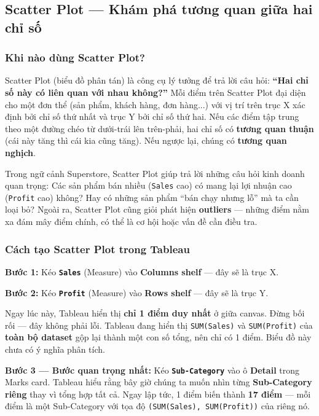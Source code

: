\documentclass[12pt]{article}
\begin{document}
\subsection{Scatter Plot --- Khám phá tương quan giữa hai chỉ số}

\subsubsection{Khi nào dùng Scatter Plot?}

\noindent Scatter Plot (biểu đồ phân tán) là công cụ lý tưởng để trả lời câu hỏi: \textbf{``Hai chỉ số này có liên quan với nhau không?''} Mỗi điểm trên Scatter Plot đại diện cho một đơn thể (sản phẩm, khách hàng, đơn hàng...) với vị trí trên trục X xác định bởi chỉ số thứ nhất và trục Y bởi chỉ số thứ hai. Nếu các điểm tập trung theo một đường chéo từ dưới-trái lên trên-phải, hai chỉ số có \textbf{tương quan thuận} (cái này tăng thì cái kia cũng tăng). Nếu ngược lại, chúng có \textbf{tương quan nghịch}.

\noindent Trong ngữ cảnh Superstore, Scatter Plot giúp trả lời những câu hỏi kinh doanh quan trọng: Các sản phẩm bán nhiều (\texttt{Sales} cao) có mang lại lợi nhuận cao (\texttt{Profit} cao) không? Hay có những sản phẩm ``bán chạy nhưng lỗ'' mà ta cần loại bỏ? Ngoài ra, Scatter Plot cũng giỏi phát hiện \textbf{outliers} --- những điểm nằm xa đám mây điểm chính, có thể là cơ hội hoặc vấn đề cần điều tra.

\subsubsection{Cách tạo Scatter Plot trong Tableau}

\noindent \textbf{Bước 1:} Kéo \textbf{\texttt{Sales}} (Measure) vào \textbf{Columns shelf} --- đây sẽ là trục X.

\noindent \textbf{Bước 2:} Kéo \textbf{\texttt{Profit}} (Measure) vào \textbf{Rows shelf} --- đây sẽ là trục Y.

\noindent Ngay lúc này, Tableau hiển thị \textbf{chỉ 1 điểm duy nhất} ở giữa canvas. Đừng bối rối --- đây không phải lỗi. Tableau đang hiển thị \texttt{SUM(Sales)} và \texttt{SUM(Profit)} của \textbf{toàn bộ dataset} gộp lại thành một con số tổng, nên chỉ có 1 điểm. Biểu đồ này chưa có ý nghĩa phân tích.

\noindent \textbf{Bước 3 --- Bước quan trọng nhất:} Kéo \textbf{\texttt{Sub-Category}} vào ô \textbf{Detail} trong Marks card. Tableau hiểu rằng bây giờ chúng ta muốn nhìn từng \textbf{Sub-Category riêng} thay vì tổng hợp tất cả. Ngay lập tức, 1 điểm biến thành \textbf{17 điểm} --- mỗi điểm là một Sub-Category với tọa độ \texttt{(SUM(Sales), SUM(Profit))} của riêng nó.
\end{document}
